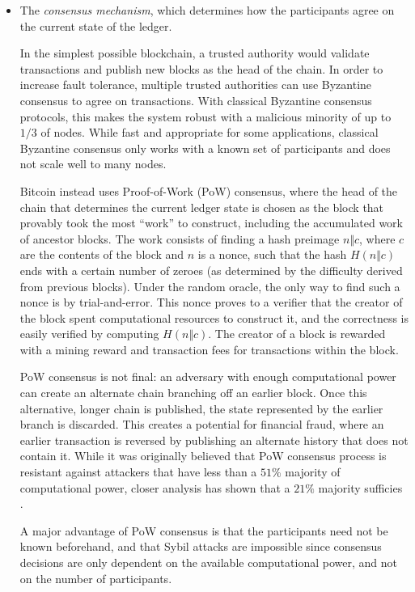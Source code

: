 \begin{itemize}
  \item The \emph{consensus mechanism}, which determines how the participants
    agree on the current state of the ledger.

    In the simplest possible blockchain, a trusted authority would validate
    transactions and publish new blocks as the head of the chain.  In order to
    increase fault tolerance, multiple trusted authorities can use Byzantine
    consensus to agree on transactions.  With classical Byzantine consensus
    protocols, this makes the system robust with a malicious minority of up to
    $1/3$ of nodes.  While fast and appropriate for some applications,
    classical Byzantine consensus only works with a known set of participants
    and does not scale well to many nodes.

    Bitcoin instead uses Proof-of-Work (PoW) consensus, where the head of the
    chain that determines the current ledger state is chosen as the block that
    provably took the most ``work'' to construct, including the accumulated
    work of ancestor blocks.  The work consists of finding a hash preimage $n
    \Vert c$, where $c$ are the contents of the block and $n$ is a nonce, such
    that the hash $H(n \Vert c)$ ends with a certain number of zeroes (as
    determined by the difficulty derived from previous blocks).  Under the
    random oracle, the only way to find such a nonce is by trial-and-error.
    This nonce proves to a verifier that the creator of the block spent
    computational resources to construct it, and the correctness is easily
    verified by computing $H(n \Vert c)$.  The creator of a block is rewarded
    with a mining reward and transaction fees for transactions within the
    block.

    PoW consensus is not final:  an adversary with enough computational power
    can create an alternate chain branching off an earlier block.  Once this
    alternative, longer chain is published, the state represented by the
    earlier branch is discarded.  This creates a potential for financial fraud,
    where an earlier transaction is reversed by publishing an alternate history
    that does not contain it.  While it was originally believed that PoW
    consensus process is resistant against attackers that have less than a
    $51\%$ majority of computational power, closer analysis has shown that a
    $21\%$ majority sufficies \cite{eyal2018majority}.

    A major advantage of PoW consensus is that the participants need not be
    known beforehand, and that Sybil attacks are impossible since consensus
    decisions are only dependent on the available computational power, and not
    on the number of participants.


\end{itemize}
